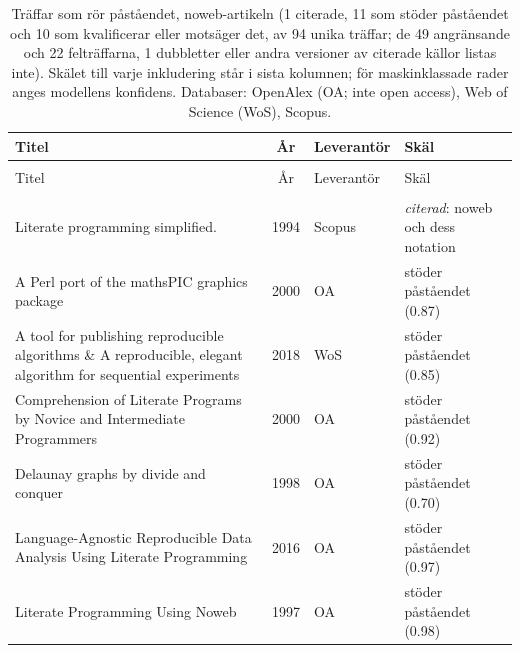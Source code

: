 
\begingroup\footnotesize
\begin{longtable}{@{}%
  >{\raggedright\arraybackslash}p{}c%
  >{\raggedright\arraybackslash}p{}%
  >{\raggedright\arraybackslash}p{}@{}}
\caption{Träffar som rör påståendet, noweb-artikeln (1 citerade, 11 som stöder påståendet och 10 som kvalificerar eller motsäger det, av 94 unika träffar; de 49 angränsande och 22 felträffarna, 1 dubbletter eller andra versioner av citerade källor listas inte). Skälet till varje inkludering står i sista kolumnen; för maskinklassade rader anges modellens konfidens. Databaser: OpenAlex (OA; inte open access), Web of Science (WoS), Scopus.}\label{tab:sok-noweb}\\
\toprule
Titel & År & Leverantör & Skäl \\
\midrule
\endfirsthead
\multicolumn{4}{@{}l}{\emph{\tablename~\thetable{} (forts.)}}\\
\toprule
Titel & År & Leverantör & Skäl \\
\midrule
\endhead
\midrule \multicolumn{4}{r@{}}{\emph{forts.\ på nästa sida}}\\
\endfoot
\bottomrule
\endlastfoot
Literate programming simplified. & 1994 & Scopus & \emph{citerad}: noweb och dess notation \\
A Perl port of the mathsPIC graphics package & 2000 & OA & stöder påståendet (0.87) \\
A tool for publishing reproducible algorithms \& A reproducible, elegant algorithm for sequential experiments & 2018 & WoS & stöder påståendet (0.85) \\
Comprehension of Literate Programs by Novice and Intermediate Programmers & 2000 & OA & stöder påståendet (0.92) \\
Delaunay graphs by divide and conquer & 1998 & OA & stöder påståendet (0.70) \\
Language-Agnostic Reproducible Data Analysis Using Literate Programming & 2016 & OA & stöder påståendet (0.97) \\
Literate Programming Using Noweb & 1997 & OA & stöder påståendet (0.98) \\

\end{longtable}
